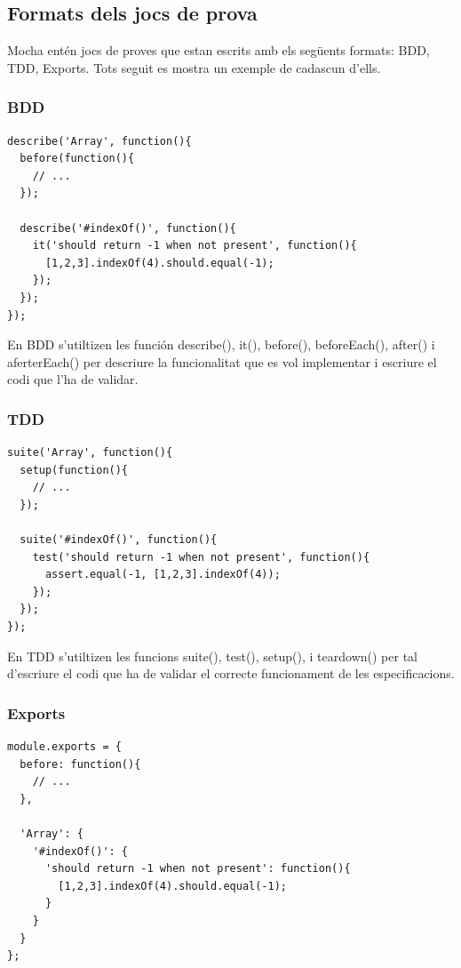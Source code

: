 \subsection{Formats dels jocs de prova}
\label{sec:format-jocs-prova}
Mocha entén jocs de proves que estan escrits amb els següents formats: BDD, TDD, Exports. Tots seguit es mostra un exemple de cadascun d'ells. 

\subsubsection{BDD}
\begin{lstlisting}
describe('Array', function(){
  before(function(){
    // ...
  });

  describe('#indexOf()', function(){
    it('should return -1 when not present', function(){
      [1,2,3].indexOf(4).should.equal(-1);
    });
  });
});
\end{lstlisting}

En BDD s'utiltizen les función describe(), it(), before(), beforeEach(), after() i aferterEach() per descriure la funcionalitat que es vol implementar i escriure el codi que l'ha de validar.

\subsubsection{TDD}
\begin{lstlisting}
suite('Array', function(){
  setup(function(){
    // ...
  });

  suite('#indexOf()', function(){
    test('should return -1 when not present', function(){
      assert.equal(-1, [1,2,3].indexOf(4));
    });
  });
});

\end{lstlisting}

En TDD s'utiltizen les funcions suite(), test(), setup(), i teardown() per tal d'escriure el codi que ha de validar el correcte funcionament de les especificacions.

\subsubsection{Exports}
\begin{lstlisting}
module.exports = {
  before: function(){
    // ...
  },

  'Array': {
    '#indexOf()': {
      'should return -1 when not present': function(){
        [1,2,3].indexOf(4).should.equal(-1);
      }
    }
  }
};

\end{lstlisting}

